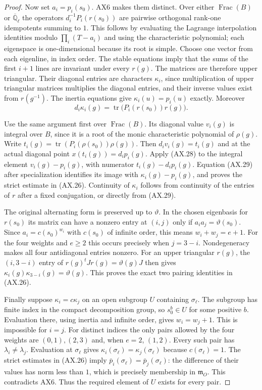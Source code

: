 \begin{proof}
Now set $a_i=p_i(s_0)$.  AX6 makes them distinct.  Over either
$\operatorname{Frac}(B)$ or $\overline{\mathbb Q}_\ell$ the
operators $d_i^{-1}P_i(r(s_0))$ are pairwise orthogonal rank-one
idempotents summing to $1$.  This follows by evaluating the
Lagrange interpolation identities modulo
$\prod_i(T-a_i)$ and using the characteristic polynomial; each
eigenspace is one-dimensional because its root is simple.
Choose one vector from each eigenline, in index order.
The stable equations imply that the sums of the first $i+1$
lines are invariant under every $r(g)$.  The matrices are
therefore upper triangular.  Their diagonal entries are
characters $\kappa_i$, since multiplication of upper triangular
matrices multiplies the diagonal entries, and their inverse
values exist from $r(g^{-1})$.  The inertia equations give
$\kappa_i(u)=p_i(u)$ exactly.  Moreover
\[
 d_i\kappa_i(g)=\operatorname{tr}\big(P_i(r(s_0))r(g)\big).
 \tag{AX.29}
\]

Use the same argument first over $\operatorname{Frac}(B)$.
Its diagonal value $v_i(g)$ is integral over $B$, since it is
a root of the monic characteristic polynomial of $\rho(g)$.
Write $t_i(g)=\operatorname{tr}(P_i(\rho(s_0))\rho(g))$.
Then $d_i v_i(g)=t_i(g)$ and at the actual diagonal point
$x(t_i(g))=d_i p_i(g)$.
Apply (AX.28) to the integral element $v_i(g)-p_i(g)$,
with numerator $t_i(g)-d_i p_i(g)$.  Equation (AX.29) after
specialization identifies its image with
$\kappa_i(g)-p_i(g)$, and proves the strict estimate in (AX.26).
Continuity of $\kappa_i$ follows from continuity of the entries
of $r$ after a fixed conjugation, or directly from (AX.29).

The original alternating form is preserved up to $\vartheta$.
In the chosen eigenbasis for $r(s_0)$ its matrix can have a
nonzero entry at $(i,j)$ only if
$a_i a_j=\vartheta(s_0)$.
Since $a_i=c(s_0)^{w_i}$ with $c(s_0)$ of infinite order,
this means $w_i+w_j=e+1$.
For the four weights and $e\ge2$ this occurs precisely when
$j=3-i$.  Nondegeneracy makes all four antidiagonal entries
nonzero.  For an upper triangular $r(g)$, the $(i,3-i)$ entry
of $r(g)^tJr(g)=\vartheta(g)J$ then gives
$\kappa_i(g)\kappa_{3-i}(g)=\vartheta(g)$.
This proves the exact two pairing identities in (AX.26).

Finally suppose $\kappa_i=c\kappa_j$ on an open subgroup $U$
containing $\sigma_\ell$.  The subgroup has finite index in
the compact decomposition group, so $s_0^b\in U$ for some
positive $b$.  Evaluation there, using inertia and infinite
order, gives $w_i=w_j+1$.  This is impossible for $i=j$.
For distinct indices the only pairs allowed by the four weights
are $(0,1),(2,3)$ and, when $e=2$, $(1,2)$.
Every such pair has $\lambda_i\ne\lambda_j$.
Evaluation at $\sigma_\ell$ gives
$\kappa_i(\sigma_\ell)=\kappa_j(\sigma_\ell)$ because
$c(\sigma_\ell)=1$.  The strict estimates in (AX.26) imply
$\bar p_i(\sigma_\ell)=\bar p_j(\sigma_\ell)$: the difference
of their values has norm less than $1$, which is precisely
membership in $\mathfrak m_O$.  This contradicts AX6.
Thus the required element of $U$ exists for every pair.
\end{proof}

